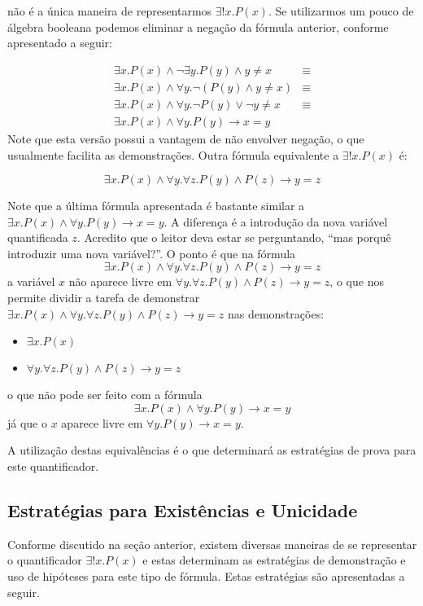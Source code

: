 não é a única maneira de representarmos $\exists ! x. P(x)$. Se
utilizarmos um pouco de álgebra booleana podemos eliminar a negação da
fórmula anterior, conforme apresentado a seguir:

\[
\begin{array}{lc}
\exists x. P(x) \land \neg \exists y. P(y) \land y \neq x & \equiv \\
\exists x. P(x) \land \forall y. \neg (P(y)\land y \neq x) & \equiv \\
\exists x. P(x) \land \forall y. \neg P(y) \lor \neg y \neq x &
\equiv\\
\exists x .P(x) \land \forall y. P(y) \to x = y &
\end{array}
\]
Note que esta versão possui a vantagem de não envolver negação, o que
usualmente facilita as demonstrações. Outra fórmula equivalente a
$\exists ! x. P(x)$ é:

\[
\exists x. P(x) \land \forall y.\forall z. P(y)\land P(z) \to y = z
\]

Note que a última fórmula apresentada é bastante similar a $\exists x
.P(x) \land \forall y. P(y) \to x = y$. A diferença é a introdução da
nova variável quantificada $z$. Acredito que o leitor deva estar se
perguntando, ``mas porquê introduzir uma nova variável?''. O ponto é
que na fórmula
\[
\exists x. P(x) \land \forall y.\forall z. P(y)\land P(z) \to y = z
\]
a variável $x$ não aparece livre em $\forall y.\forall z. P(y)\land
P(z) \to y = z$, o que nos permite dividir a tarefa de demonstrar
$\exists x. P(x) \land \forall y.\forall z. P(y)\land P(z) \to y = z$
nas demonstrações:
\begin{itemize}
  \item $\exists x. P(x)$
  \item $\forall y.\forall z. P(y)\land P(z) \to y = z$
\end{itemize}
o que não pode ser feito com a fórmula
\[
\exists x .P(x) \land \forall y. P(y) \to x = y
\]
já que o $x$ aparece livre em $\forall y. P(y) \to x = y$.

A utilização destas equivalências é o que determinará as estratégias
de prova para este quantificador.

\subsection{Estratégias para Existências e Unicidade}

Conforme discutido na seção anterior, existem diversas maneiras de se
representar o quantificador $\exists ! x. P(x)$ e estas determinam as
estratégias de demonstração e uso de hipóteses para este tipo de
fórmula. Estas estratégias são apresentadas a seguir.


